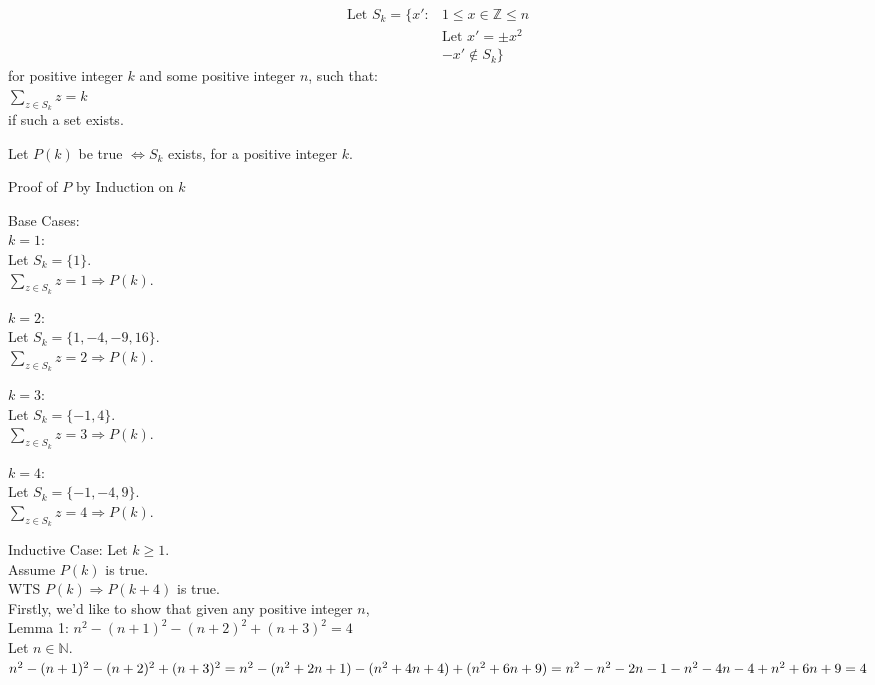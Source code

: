 \documentclass[fleqn]{article}
\begin{document}
\begin{align*}
  \text{Let } S_{k} = \lbrace x' : & 1 \leq x \in \mathbb{Z} \leq n \\
	                          & \text{Let } x' = \pm x^2 \\
		                  & -x' \not\in S_{k}
             \rbrace
             \end{align*}
for positive integer $k$ and some positive integer $n$, such that:\\
$\displaystyle\sum\limits_{z \in S_{k}} z = k$\\
if such a set exists.

Let $P(k)$ be true $\Leftrightarrow S_{k} $ exists, for a positive integer $k$.

Proof of $P$ by Induction on $k$

Base Cases:\\
$k = 1:$\\
Let $S_{k} = \lbrace 1 \rbrace$.\\
$\displaystyle\sum\limits_{z \in S_{k}} z = 1 \Rightarrow P(k)$.

$k = 2:$\\
Let $S_{k} = \lbrace 1,-4,-9,16 \rbrace$.\\
$\displaystyle\sum\limits_{z \in S_{k}} z = 2 \Rightarrow P(k)$.

$k = 3:$\\
Let $S_{k} = \lbrace-1,4\rbrace$.\\
$\displaystyle\sum\limits_{z \in S_{k}} z = 3 \Rightarrow P(k)$.

$k = 4:$\\
Let $S_{k} = \lbrace -1,-4,9 \rbrace$.\\
$\displaystyle\sum\limits_{z \in S_{k}} z = 4 \Rightarrow P(k)$.

Inductive Case: Let $k \geq 1$.\\
Assume $P(k)$ is true.\\
WTS $P(k) \Rightarrow P(k+4)$ is true.\\
Firstly, we'd like to show that given any positive integer $n$, \\
Lemma 1: $n^2 - (n+1)^2 - (n+2)^2 + (n+3)^2 = 4$\\
Let $n \in \mathbb{N}$.\\
$n^2 - (n+1) ^2 - (n+2)^2 + (n+3)^2 =\\
n^2 - (n^2 + 2n + 1) - (n^2 + 4n + 4) + (n^2 + 6n + 9) =\\
n^2 - n^2 - 2n - 1 - n^2 - 4n - 4 + n^2 + 6n + 9 = \\
4 $
\end{document}
